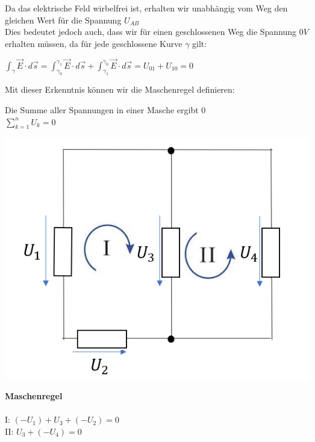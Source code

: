 										Da das elektrische Feld wirbelfrei ist, erhalten wir unabhängig vom Weg den gleichen Wert für die Spannung $ U_{AB} $ \\
										Dies bedeutet jedoch auch, dass wir für einen geschlossenen Weg die Spannung $0V$ erhalten müssen, da für jede geschlossene Kurve $\gamma$ gilt:
										\begin{center}
											\vspace{-2mm}

											$\displaystyle \int_{\gamma} \vec{E} \cdot d\vec{s} = \int_{\gamma_0}^{\gamma_1} \vec{E} \cdot d\vec{s} + \int_{\gamma_1}^{\gamma_0} \vec{E} \cdot d\vec{s} = U_{01} + U_{10} = 0$
										\end{center}
										Mit dieser Erkenntnis können wir die Maschenregel definieren:

										\beginip
										Die Summe aller Spannungen in einer Masche ergibt $0$ \\
										\formulaBegin
										$\displaystyle \sum_{k=1}^n U_k = 0$
										\formulaEnd

										\iend

										\begin{minipage}{0.6\textwidth}
											\begin{flushright}
											\includegraphics[scale=0.45]{img/maschenregel-2.png}
										\end{flushright}
										\end{minipage}
										\begin{minipage}{0.4\textwidth}
											\textbf{Maschenregel} \\ \\
											I: $\displaystyle (- U_1) + U_3 + (-U_2)  = 0$ \\
											II: $\displaystyle U_3 + (- U_4) = 0 $ \\
										\end{minipage}


